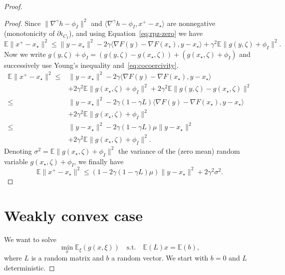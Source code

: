 \documentclass{article}
\newcommand{\1}{\mathbbm 1}
\newcommand{\bE}{{{\mathbb E}}}
\newcommand{\ps}[1]{\langle #1 \rangle}
\theoremstyle{definition}
\begin{document}
\begin{proof}
\begin{proof}
Since $\|\nabla ^\gamma h - \phi_I\|^2$ and $\ps{\nabla ^\gamma h - \phi_I,x^+-x_\star}$ are nonnegative (monotonicity of $\partial \iota_{C_I}$), and using Equation~\eqref{eq:rpz-zero} we have
\begin{equation*}
    \bE \|x^+ - x_\star\|^2 \leq \|y - x_\star\|^2 -2\gamma \ps{\nabla F(y) - \nabla F(x_\star),y-x_\star} + \gamma^2 \bE \|g(y,\zeta) + \phi_I\|^2.
\end{equation*}
Now we write $g(y,\zeta) + \phi_I = (g(y,\zeta) - g(x_\star,\zeta)) + (g(x_\star,\zeta) + \phi_I)$ and successively use Young's inequality and~\eqref{eq:cocoercivity}.
\begin{align*}
    \bE \|x^+ - x_\star\|^2 \leq& \|y - x_\star\|^2 -2\gamma \ps{\nabla F(y) - \nabla F(x_\star),y-x_\star}\\
    &+ 2\gamma^2 \bE \|g(x_\star,\zeta) + \phi_I\|^2 + 2\gamma^2 \bE\|g(y,\zeta) - g(x_\star,\zeta)\|^2\\
    \leq& \|y - x_\star\|^2 -2\gamma(1-\gamma L) \ps{\nabla F(y) - \nabla F(x_\star),y-x_\star}\\
    &+ 2\gamma^2 \bE \|g(x_\star,\zeta) + \phi_I\|^2\\
    \leq& \|y - x_\star\|^2 -2\gamma(1-\gamma L)\mu \|y-x_\star\|^2\\
    &+ 2\gamma^2 \bE \|g(x_\star,\zeta) + \phi_I\|^2.
\end{align*}
Denoting $\sigma^2 = \bE \|g(x_\star,\zeta) + \phi_I\|^2$ the variance of the (zero mean) random variable $g(x_\star,\zeta) + \phi_I$, we finally have
\begin{equation}
\label{eq:linear-neighborhood-rpsg}
    \bE \|x^+ - x_\star\|^2 \leq (1-2\gamma(1-\gamma L)\mu)\|y - x_\star\|^2 + 2\gamma^2 \sigma^2. 
\end{equation}
\end{proof}

\section{Weakly convex case}


We want to solve 
\begin{equation}
    \min_x \bE_\xi(g(x,\xi)) \quad\text{s.t.}\quad \bE(L)x = \bE(b),
\end{equation}
where $L$ is a random matrix and $b$ a random vector. We start with $b = 0$ and $L$ deterministic. 


\end{proof}
\end{document}
